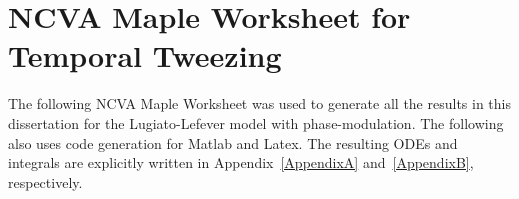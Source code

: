 \chapter{NCVA Maple Worksheet for Temporal Tweezing} %
\label{AppendixD} %

The following NCVA Maple Worksheet was used to generate all the results in this dissertation for the Lugiato-Lefever model with phase-modulation.  The following also uses code generation for Matlab and Latex.  The resulting ODEs and integrals are explicitly written in Appendix~\ref{AppendixA} and~\ref{AppendixB}, respectively.

%

